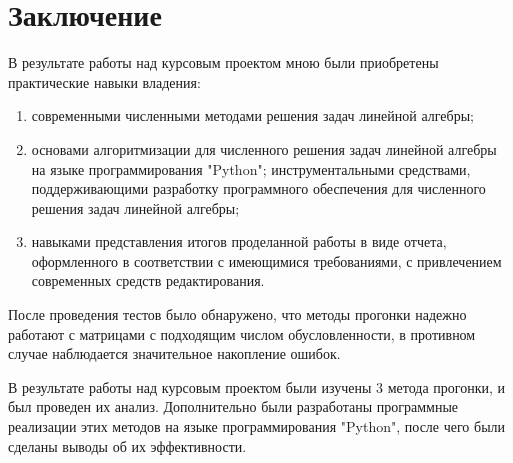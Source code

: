 \section{Заключение}
В результате работы над курсовым проектом мною были приобретены практические навыки владения:
\begin{enumerate}
  \item современными численными методами решения задач линейной алгебры;
  \item основами алгоритмизации для численного решения задач линейной алгебры на языке программирования "Python";
  инструментальными средствами, поддерживающими разработку программного обеспечения для численного решения задач линейной алгебры;
  \item навыками представления итогов проделанной работы в виде отчета, оформленного в соответствии с имеющимися требованиями, с привлечением 
  современных средств редактирования.
\end{enumerate}

После проведения тестов было обнаружено, что методы прогонки надежно работают с матрицами с подходящим числом обусловленности,
в противном случае наблюдается значительное накопление ошибок.

В результате работы над курсовым проектом были изучены 3 метода прогонки, и был проведен их анализ.
Дополнительно были разработаны программные реализации этих методов на языке программирования "Python", после чего были сделаны выводы об их эффективности.
